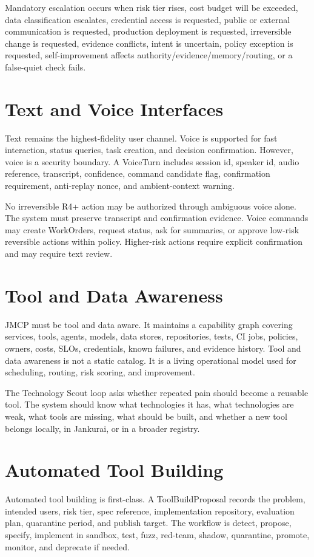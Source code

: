 \documentclass[12pt,journal,onecolumn,draftclsnofoot]{IEEEtran}
\begin{document}
Mandatory escalation occurs when risk tier rises, cost budget will be exceeded, data classification escalates, credential access is requested, public or external communication is requested, production deployment is requested, irreversible change is requested, evidence conflicts, intent is uncertain, policy exception is requested, self-improvement affects authority/evidence/memory/routing, or a false-quiet check fails.

\section{Text and Voice Interfaces}
Text remains the highest-fidelity user channel. Voice is supported for fast interaction, status queries, task creation, and decision confirmation. However, voice is a security boundary. A VoiceTurn includes session id, speaker id, audio reference, transcript, confidence, command candidate flag, confirmation requirement, anti-replay nonce, and ambient-context warning.

No irreversible R4+ action may be authorized through ambiguous voice alone. The system must preserve transcript and confirmation evidence. Voice commands may create WorkOrders, request status, ask for summaries, or approve low-risk reversible actions within policy. Higher-risk actions require explicit confirmation and may require text review.

\section{Tool and Data Awareness}
JMCP must be tool and data aware. It maintains a capability graph covering services, tools, agents, models, data stores, repositories, tests, CI jobs, policies, owners, costs, SLOs, credentials, known failures, and evidence history. Tool and data awareness is not a static catalog. It is a living operational model used for scheduling, routing, risk scoring, and improvement.

The Technology Scout loop asks whether repeated pain should become a reusable tool. The system should know what technologies it has, what technologies are weak, what tools are missing, what should be built, and whether a new tool belongs locally, in Jankurai, or in a broader registry.

\section{Automated Tool Building}
Automated tool building is first-class. A ToolBuildProposal records the problem, intended users, risk tier, spec reference, implementation repository, evaluation plan, quarantine period, and publish target. The workflow is detect, propose, specify, implement in sandbox, test, fuzz, red-team, shadow, quarantine, promote, monitor, and deprecate if needed.
\end{document}

